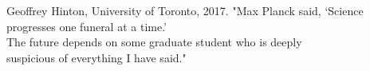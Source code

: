 \begin{prequote}[20pt]{Geoffrey Hinton, University of Toronto, 2017.}
    "Max Planck said, ‘Science progresses one funeral at a time.’\\
    The future depends on some graduate student who is deeply\\
    suspicious of everything I have said."\\

\end{prequote}